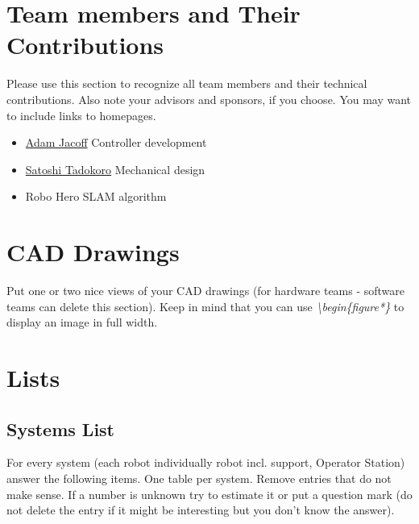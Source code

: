 \documentclass[journal]{IEEEtran}
\begin{document}
%


\appendices

\section{Team members and Their Contributions}
Please use this section to recognize all team members and their technical contributions.  Also note your advisors and sponsors, if you choose. You may want to include links to homepages.

\begin{itemize}
 \item  \href{http://www.nist.gov/el/isd/ms/jacoff.cfm}{Adam Jacoff} \hfill Controller development
 \item \href{http://www.rm.is.tohoku.ac.jp/englishtop/}{Satoshi Tadokoro} \hfill Mechanical design
 \item Robo Hero \hfill SLAM algorithm
\end{itemize}



\section{CAD Drawings}
Put one or two nice views of your CAD drawings (for hardware teams - software teams can delete this section). Keep in mind that you can use \textit{\textbackslash begin\{figure*\}} to display an image in full width.

\section{Lists}
\subsection{Systems List}
For every system (each robot individually robot incl. support, Operator Station) answer the following items. One table per system. Remove entries that do not make sense. If a number is unknown try to estimate it or put a question mark (do not delete the entry if it might be interesting but you don't know the answer).
\end{document}
